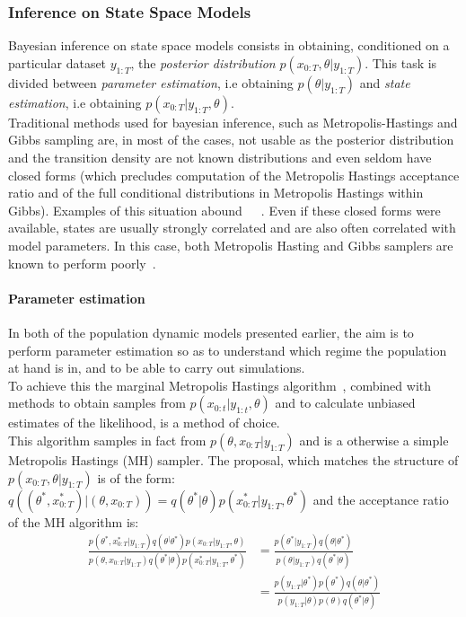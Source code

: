 \documentclass{article}
\begin{document}
	\subsubsection{Inference on State Space Models}
	Bayesian inference on state space models consists in obtaining, conditioned on a particular dataset $y_{1:T}$, the \emph{posterior distribution} $p(x_{0:T}, \theta| y_{1:T})$. This task is divided between \emph{parameter estimation}, i.e obtaining $p(\theta | y_{1:T})$  and \emph{state estimation}, i.e obtaining $p(x_{0:T}|y_{1:T}, \theta)$. \\
	Traditional methods used for bayesian inference, such as Metropolis-Hastings and Gibbs sampling are, in most of the cases, not usable as the posterior distribution and the transition density are not known distributions and even seldom have closed forms (which precludes computation of the Metropolis Hastings acceptance ratio and of the full conditional distributions in Metropolis Hastings within Gibbs). Examples of this situation abound~\cite{beskos2006exact}~\cite{fearnhead2008particle}~\cite{murray2011particle}. Even if these closed forms were available, states are usually strongly correlated and are also often correlated with model parameters. In this case, both Metropolis Hasting and Gibbs samplers are known to perform poorly~\cite{van2011partially}. \\

	
	\paragraph{Parameter estimation}
	In both of the population dynamic models presented earlier, the aim is to perform parameter estimation so as to understand which regime the population at hand is in, and to be able to carry out simulations. \\
	To achieve this the marginal Metropolis Hastings algorithm~\cite{hastings1970monte}, combined with methods to obtain samples from  $p(x_{0:t}| y_{1:t}, \theta)$ and to calculate unbiased estimates of the likelihood, is a method of choice. \\
	This algorithm samples in fact from $p(\theta, x_{0:T} | y_{1:T})$ and is a otherwise a simple Metropolis Hastings (MH) sampler. The proposal, which matches the structure of $p(x_{0:T}, \theta | y_{1:T})$ is of the form: $q((\theta^*, x_{0:T}^*) | (\theta, x_{0:T})) = q(\theta^* | \theta)p(x_{0:T}^* | y_{1:T}, \theta^*)$ and the acceptance ratio of the MH algorithm is: 
	\begin{align*}
	\frac{p(\theta^*, x_{0:T}^* | y_{1:T})q(\theta^ | \theta^*)p(x_{0:T} | y_{1:T}, \theta)}{p(\theta, x_{0:T} | y_{1:T})q(\theta^* | \theta)p(x_{0:T}^* | y_{1:T}, \theta^*)} & = \frac{p(\theta^* | y_{1:T})q(\theta | \theta^*)}{p(\theta | y_{1:T})q(\theta^* | \theta)} \\
	& = \frac{p(y_{1:T} | \theta^*)p(\theta^*)q(\theta | \theta^*)}{p(y_{1:T}|\theta)p(\theta)q(\theta^* | \theta)}
	\end{align*}
	
\end{document}
